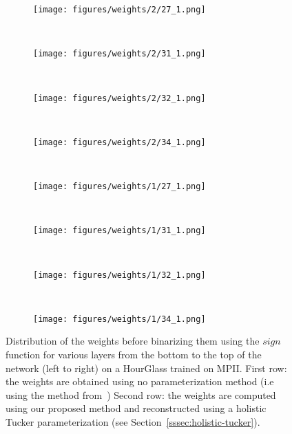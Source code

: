 \documentclass[10pt,twocolumn,letterpaper]{article}
\begin{document}
\begin{figure*}[!htbp]
    \centering
    \begin{subfigure}[t]{0.23\textwidth}
    \centering
    \texttt{[image: figures/weights/2/27\_1.png]}
    \end{subfigure}
    ~
    \begin{subfigure}[t]{0.23\textwidth}
    \centering
    \texttt{[image: figures/weights/2/31\_1.png]}
    \end{subfigure}
    ~
    \begin{subfigure}[t]{0.23\textwidth}
    \centering
    \texttt{[image: figures/weights/2/32\_1.png]}
    \end{subfigure}
    ~
    \begin{subfigure}[t]{0.23\textwidth}
    \centering
    \texttt{[image: figures/weights/2/34\_1.png]}
    \end{subfigure}
    ~
    \begin{subfigure}[t]{0.23\textwidth}
    \centering
    \texttt{[image: figures/weights/1/27\_1.png]}
    \end{subfigure}
     ~
    \begin{subfigure}[t]{0.23\textwidth}
    \centering
    \texttt{[image: figures/weights/1/31\_1.png]}
    \end{subfigure}
    ~
    \begin{subfigure}[t]{0.23\textwidth}
    \centering
    \texttt{[image: figures/weights/1/32\_1.png]}
    \end{subfigure}
    ~
    \begin{subfigure}[t]{0.23\textwidth}
    \centering
    \texttt{[image: figures/weights/1/34\_1.png]}
    \end{subfigure}
    
    \caption{Distribution of the weights before binarizing them using the $\textit{sign}$ function for various layers from the bottom to the top of the network (left to right) on a HourGlass trained on MPII. First row: the weights are obtained using no parameterization method (i.e using the method from~\cite{rastegari2016xnor,bulat2017binarized}) Second row: the weights are computed using our proposed method and reconstructed using a holistic Tucker parameterization (see Section~\ref{sssec:holistic-tucker}).}
    \label{fig:weights}
\end{figure*}
\end{document}
